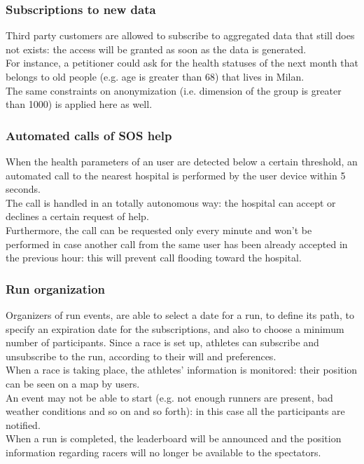 \subsubsection{Subscriptions to new data}
Third party customers are allowed to subscribe to aggregated data that still does not exists: the access will be granted as soon as the data is generated.\\
For instance, a petitioner could ask for the health statuses of the next month that belongs to old people (e.g. age is greater than 68) that lives in Milan. \\
The same constraints on anonymization (i.e. dimension of the group is greater than 1000) is applied here as well.

\subsubsection{Automated calls of SOS help}
When the health parameters of an user are detected below a certain threshold, an automated call to the nearest hospital is performed by the user device within 5 seconds. \\
The call is handled in an totally autonomous way: the hospital can accept or declines a certain request of help. \\  
Furthermore, the call can be requested only every minute and won't be performed in case another call from the same user has been already accepted in the previous hour: this will prevent call flooding toward the hospital. 

\subsubsection{Run organization}
Organizers of run events, are able to select a date for a run, to define its path, to specify an expiration date for the subscriptions, and also to choose a minimum number of participants.
Since a race is set up, athletes can subscribe and unsubscribe to the run, according to their will and preferences. \\
When a race is taking place, the athletes' information is monitored: their position can be seen on a map by users.\\
An event may not be able to start (e.g. not enough runners are present, bad weather conditions and so on and so forth): in this case all the participants are notified. \\
When a run is completed, the leaderboard will be announced and the position information regarding racers will no longer be available to the spectators.  